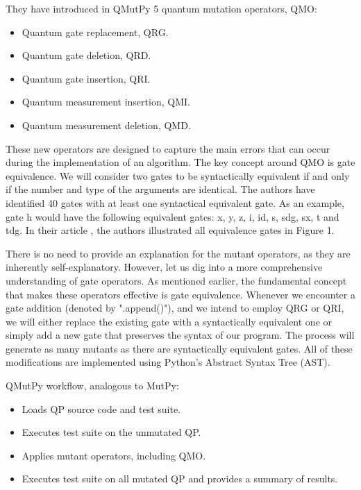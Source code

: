 \begin{itemize}
They have introduced in QMutPy 5 quantum mutation operators, QMO:
\begin{itemize}
    \item Quantum gate replacement, QRG.
    \item Quantum gate deletion, QRD.
    \item Quantum gate insertion, QRI.
    \item Quantum measurement insertion, QMI.
    \item Quantum measurement deletion, QMD.
\end{itemize}

\vspace{5pt}
These new operators are designed to capture the main errors that can occur during the implementation of an algorithm. The key concept around QMO is gate equivalence. We will consider two gates to be syntactically equivalent if and only if the number and type of the arguments are identical. The authors have identified 40 gates with at least one syntactical equivalent gate. As an example, gate h would have the following equivalent gates: x, y, z, i, id, s, sdg, sx, t and tdg. In their article \cite{fortunato2022mutation}, the authors illustrated all equivalence gates in Figure 1.  \newline

There is no need to provide an explanation for the mutant operators, as they are inherently self-explanatory.  However, let us dig into a more comprehensive understanding of gate operators. As mentioned earlier, the fundamental concept that makes these operators effective is gate equivalence. Whenever we encounter a gate addition (denoted by ".append()"), and we intend to employ QRG or QRI, we will either replace the existing gate with a syntactically equivalent one or simply add a new gate that preserves the syntax of our program. The process will generate as many mutants as there are syntactically equivalent gates. All of these modifications are implemented using Python's Abstract Syntax Tree (AST).\newline

QMutPy workflow, analogous to MutPy:
\begin{itemize}
    \item Loads QP source code and test suite.
    \item Executes test suite on the unmutated QP.
    \item Applies mutant operators, including QMO.
    \item Executes test suite on all mutated QP and provides a summary of results.
\end{itemize}


\end{itemize}

